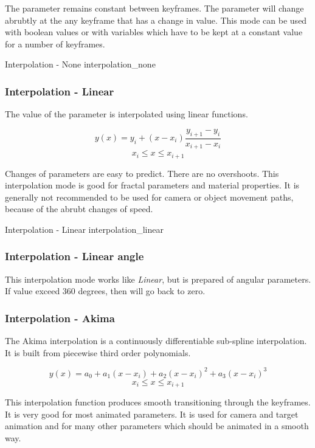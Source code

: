 The parameter remains constant between keyframes. The parameter will change abrubtly at the any keyframe that has a change in value. This mode can be used with boolean values or with variables
which have to be kept at a constant value for a number of keyframes.

{Interpolation - None}
{interpolation_none}

\subsubsection{Interpolation - Linear}\label{interpolation-linear}

The value of the parameter is interpolated using linear functions.

\[ y(x) = y_i + (x - x_i) \frac{y_{i+1} - y_i}{x_{i+1} - x_i}\] \[x_i  \leq x
\leq x_{i+1}\]

Changes of parameters are easy to predict. There are no overshoots. This
interpolation mode is good for fractal parameters and material properties. It is
generally not recommended to be used for camera or object movement paths, because of the abrubt changes of speed.

{Interpolation - Linear}
{interpolation_linear}

\subsubsection{Interpolation - Linear angle}\label{interpolation-linear-angle}

This interpolation mode works like \emph{Linear}, but is prepared of angular
parameters. If value exceed 360 degrees, then will go back to zero.

\subsubsection{Interpolation - Akima}\label{interpolation-akima}

The Akima interpolation is a continuously differentiable sub-spline
interpolation. It is built from piecewise third order polynomials.

\[ y(x) = a_0 + a_1 (x - x_i) + a_2 (x - x_i)^2 + a_3 (x - x_i)^3\] \[x_i  \leq
x \leq x_{i+1}\]

This interpolation function produces smooth transitioning through the keyframes. It is very good for most animated parameters. It 
is used for camera and target animation and for many other parameters which
should be animated in a smooth way.

